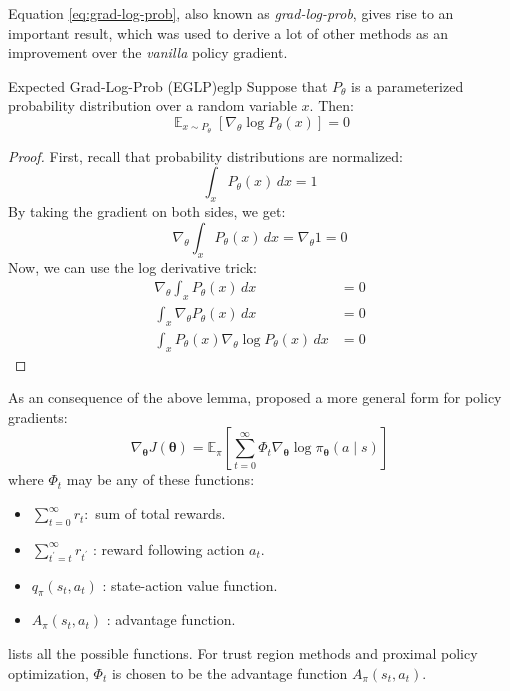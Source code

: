 Equation \ref{eq:grad-log-prob}, also known as \textit{grad-log-prob}, gives rise to an important result, which was used to derive a lot of other methods as an improvement over the \textit{vanilla} policy gradient.
\begin{lemma}{Expected Grad-Log-Prob (EGLP)}{eglp}
    Suppose that $P_\theta$ is a parameterized probability distribution over a random variable $x$. Then:
    \begin{equation}
        \mathop{\mathbb{E}}_{x \sim P_\theta}\left[\nabla_\theta \log{P_\theta(x)}\right] = 0
    \end{equation}
\end{lemma}
\begin{proof}
    First, recall that probability distributions are normalized:
    \begin{equation}
        \int_x P_\theta(x) \,dx = 1
    \end{equation}
    By taking the gradient on both sides, we get:
    \begin{equation}
        \nabla_\theta\int_x P_\theta(x) \,dx = \nabla_\theta 1 = 0
    \end{equation}
    Now, we can use the log derivative trick:
    \begin{align}
        \nabla_\theta\int_x P_\theta(x) \,dx &= 0 \nonumber\\
        \int_x \nabla_\theta P_\theta(x) \,dx &= 0 \\
        \int_x P_\theta(x) \nabla_\theta\log{P_\theta(x)} \,dx &= 0 \nonumber
    \end{align}
\end{proof}

As an consequence of the above lemma, \cite{https://doi.org/10.48550/arxiv.1506.02438} proposed a more general form for policy gradients:
\begin{equation}
    \nabla_{\boldsymbol\theta} J(\boldsymbol\theta) = \mathbb{E}_\pi\left[\sum_{t=0}^\infty\Phi_t\nabla_{\boldsymbol\theta}\log{\pi_{\boldsymbol\theta}(a \mid s)}\right]
\end{equation}
where $\Phi_t$ may be any of these functions:
\begin{itemize}
    \item $\sum_{t=0}^{\infty} r_t:$ sum of total rewards.
    \item $\sum_{t^{\prime}=t}^{\infty} r_{t^{\prime}}$ : reward following action $a_t$.
    \item $q_\pi\left(s_t, a_t\right)$ : state-action value function.
    \item $A_\pi\left(s_t, a_t\right)$ : advantage function.
\end{itemize}
\cite{https://doi.org/10.48550/arxiv.1506.02438} lists all the possible functions. For trust region methods and proximal policy optimization, $\Phi_t$ is chosen to be the advantage function $A_\pi\left(s_t, a_t\right)$.

